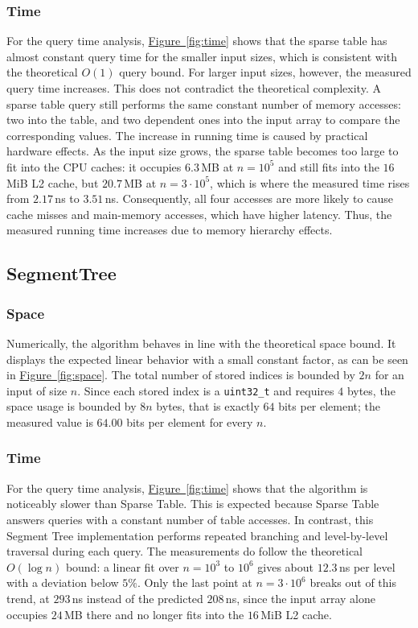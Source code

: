 \documentclass[a4paper,UKenglish,cleveref,thm-restate]{lipics-v2021}
\begin{document}
\subsubsection{Time}
For the query time analysis, \hyperref[fig:time]{Figure~\ref*{fig:time}} shows that the sparse table has almost constant query time for the smaller input sizes, which is consistent with the theoretical $O(1)$ query bound.
For larger input sizes, however, the measured query time increases.
This does not contradict the theoretical complexity.
A sparse table query still performs the same constant number of memory accesses: two into the table, and two dependent ones into the input array to compare the corresponding values.
The increase in running time is caused by practical hardware effects.
As the input size grows, the sparse table becomes too large to fit into the CPU caches: it occupies $6.3$\,MB at $n=10^5$ and still fits into the $16$\,MiB L2 cache, but $20.7$\,MB at $n=3\cdot10^5$, which is where the measured time rises from $2.17$\,ns to $3.51$\,ns.
Consequently, all four accesses are more likely to cause cache misses and main-memory accesses, which have higher latency.
Thus, the measured running time increases due to memory hierarchy effects.

\subsection{SegmentTree}
\subsubsection{Space}
Numerically, the algorithm behaves in line with the theoretical space bound.
It displays the expected linear behavior with a small constant factor, as can be seen in \hyperref[fig:space]{Figure~\ref*{fig:space}}.
The total number of stored indices is bounded by $2n$ for an input of size $n$.
Since each stored index is a \texttt{uint32\_t} and requires $4$ bytes, the space usage is bounded by $8n$ bytes, that is exactly $64$ bits per element; the measured value is $64.00$ bits per element for every $n$.
\subsubsection{Time}
For the query time analysis, \hyperref[fig:time]{Figure~\ref*{fig:time}} shows that the algorithm is noticeably slower than Sparse Table.
This is expected because Sparse Table answers queries with a constant number of table accesses.
In contrast, this Segment Tree implementation performs repeated branching and level-by-level traversal during each query.
The measurements do follow the theoretical $O(\log n)$ bound: a linear fit over $n=10^3$ to $10^6$ gives about $12.3$\,ns per level with a deviation below $5\%$.
Only the last point at $n=3\cdot10^6$ breaks out of this trend, at $293$\,ns instead of the predicted $208$\,ns, since the input array alone occupies $24$\,MB there and no longer fits into the $16$\,MiB L2 cache.
\end{document}
